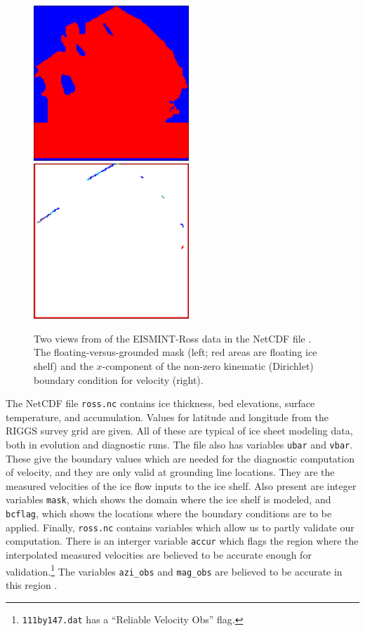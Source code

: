 \documentclass[11pt,final]{amsart}
\begin{document}
\begin{figure}[ht]
\includegraphics[height=2.3in,keepaspectratio=true]{figs/rossmask} \qquad \includegraphics[height=2.3in,keepaspectratio=true]{figs/rossubar}
\caption{Two views from  of the EISMINT-Ross data in the NetCDF file .  The floating-versus-grounded mask (left; red areas are floating ice shelf) and the $x$-component of the non-zero kinematic (Dirichlet) boundary condition for velocity (right).}
\label{fig:rossmaskubar}
\end{figure}

The NetCDF file \verb|ross.nc| contains ice thickness, bed elevations, surface temperature, and accumulation.  Values for latitude and longitude from the RIGGS survey grid \cite{RIGGS1} are given.  All of these are typical of ice sheet modeling data, both in evolution and diagnostic runs.  The file also has variables \verb|ubar| and \verb|vbar|.  These give the boundary values which are needed for the diagnostic computation of velocity, and they are only valid at grounding line locations.  They are the measured velocities of the ice flow inputs to the ice shelf.  Also present are integer variables \verb|mask|, which shows the domain where the ice shelf is modeled, and \verb|bcflag|, which shows the locations where the boundary conditions are to be applied.  Finally, \verb|ross.nc| contains variables which allow us to partly validate our computation.  There is an interger variable \verb|accur| which flags the region where the interpolated measured velocities are believed to be accurate enough for validation.\footnote{\texttt{111by147.dat} has a ``Reliable Velocity Obs'' flag.}  The variables \verb|azi_obs| and \verb|mag_obs| are believed to be accurate in this region \cite{MacAyealetal}.
\end{document}
